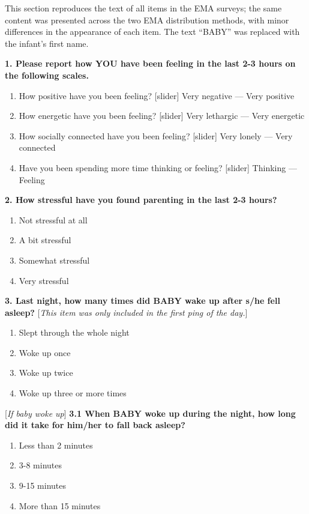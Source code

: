 \documentclass[
]{article}
\providecommand{\tightlist}{%
  \setlength{\itemsep}{0pt}\setlength{\parskip}{0pt}}
\begin{document}
This section reproduces the text of all items in the EMA surveys; the
same content was presented across the two EMA distribution methods, with
minor differences in the appearance of each item. The text ``BABY'' was
replaced with the infant's first name.

\textbf{1. Please report how YOU have been feeling in the last 2-3 hours
on the following scales.}

\begin{enumerate}
\def\labelenumi{\alph{enumi}.}
\tightlist
\item
  How positive have you been feeling? {[}slider{]} Very negative ---
  Very positive
\item
  How energetic have you been feeling? {[}slider{]} Very lethargic ---
  Very energetic
\item
  How socially connected have you been feeling? {[}slider{]} Very lonely
  --- Very connected
\item
  Have you been spending more time thinking or feeling? {[}slider{]}
  Thinking --- Feeling
\end{enumerate}

\textbf{2. How stressful have you found parenting in the last 2-3
hours?}

\begin{enumerate}
\def\labelenumi{\alph{enumi}.}
\tightlist
\item
  Not stressful at all
\item
  A bit stressful
\item
  Somewhat stressful
\item
  Very stressful
\end{enumerate}

\textbf{3. Last night, how many times did BABY wake up after s/he fell
asleep?} {[}\emph{This item was only included in the first ping of the
day.}{]}

\begin{enumerate}
\def\labelenumi{\alph{enumi}.}
\tightlist
\item
  Slept through the whole night
\item
  Woke up once
\item
  Woke up twice
\item
  Woke up three or more times
\end{enumerate}

{[}\emph{If baby woke up}{]} \textbf{3.1 When BABY woke up during the
night, how long did it take for him/her to fall back asleep?}

\begin{enumerate}
\def\labelenumi{\alph{enumi}.}
\tightlist
\item
  Less than 2 minutes
\item
  3-8 minutes
\item
  9-15 minutes
\item
  More than 15 minutes
\end{enumerate}
\end{document}
